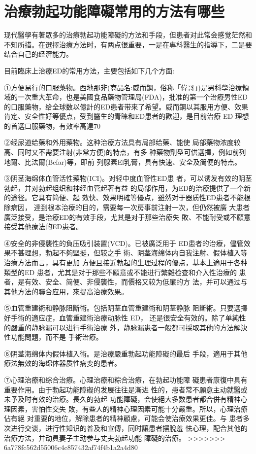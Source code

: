\documentclass[12pt,UTF8]{ctexbook}
\begin{document}
\section{治療勃起功能障礙常用的方法有哪些}

现代醫學有著眾多的治療勃起功能障礙的方法和手段，但患者对此常会感觉茫然和不知所措。在選擇治療方法时，有两点很重要，一是在專科醫生的指導下，二是要结合自己的经濟能力。

目前臨床上治療ED的常用方法，主要包括如下几个方面:

①方便易行的口服藥物。西地那非(商品名:威而鋼，俗称「偉哥」)是男科學治療領域的一次重大革命，也是美國食品藥物管理局(FDA)，批准的第一个治療男性ED的口服藥物，给全球数以億計的ED患者带來了希望。威而鋼以其服用方便、效果肯定、安全性好等優点，受到醫生的青睐和ED患者的歡迎，是目前治療 ED 理想的首選口服藥物，有效率高達70%

②经尿道给藥和外用藥物。这种治療方法具有局部给藥、能使
局部藥物浓度较高、同时又不需要注射(非常方便)的特点，有多
种藥物劑型可供選擇，例如前列地爾、比法爾(Befar)等，即前
列腺素El乳膏，具有快速、安全及简便的特点。

③阴茎海绵体血管活性藥物(ICI)。对轻中度血管性ED患
者，可以诱发有效的阴茎勃起，并对勃起组织和神经血管起著有益
的局部作用，为ED的治療提供了一个新的途径。它具有简便、起
效快、效果明確等優点，雖然对于器质性ED患者不能根除病因，
達到根本治療的目的，需要每一次房事前注射一次，但仍然被廣
大患者廣泛接受，是治療ED的有效手段，尤其是对于那些治療失
敗、不能耐受或不願意接受其他療法的ED患者。

④安全的非侵襲性的負压吸引装置(VCD)。已被廣泛用于
ED患者的治療，儘管效果不甚理想，勃起不夠堅挺，但较之手
術、阴茎海绵体内自我注射、假体植入等治療方法而言，具有更加
方便且接近勃起的生理过程的優点，基本上適用于各种類型的ED
患者，尤其是对于那些不願意或不能进行繁雜检查和介入性治療的
患者，是有效、安全、简便、非侵襲性，而價格又较为低廉的方
法，并可以通过与其他方法的聯合应用，來提高治療效果。

⑤血管重建術和静脉阻斷術。包括阴茎血管重建術和阴茎静脉
阻斷術。只要選擇好手術的適应症，血管重建術治療动脉性 ED，
还是很安全有效的。除了单純性的嚴重的静脉漏可以进行手術治療
外，静脉漏患者一般都可採取其他的方法解決性功能問題，而不是
手術治療。

⑥阴茎海绵体内假体植入術。是治療嚴重勃起功能障礙的最后
手段，適用于其他療法無效的海绵体器质性病变的患者。

⑦心理治療和综合治療。心理治療和粽合治療，在勃起功能障
礙患者康復中具有重要作用。由于勃起功能障礙的发展往往是漸进
性的，患者常不願意主动就醫或未予及时有效的治療。長久的勃起
功能障礙，会使絕大多数患者都合併有精神心理因素，害怕性交失
敗，有些人的精神心理因素可能十分嚴重。所以，心理治療佔有絕
对重要的地位，解除患者的精神顧慮，可能会使治療效果更佳。与
患者多次进行交谈，进行性知识的普及和宣傳，同时讓患者摆脫羞
怯心理，配合其他的治療方法，并动員妻子主动参与丈夫勃起功能
障礙的治療。
>>>>>>> 6a778fc562d55006c4c857432af74f4b1a2a4d80
\end{document}
